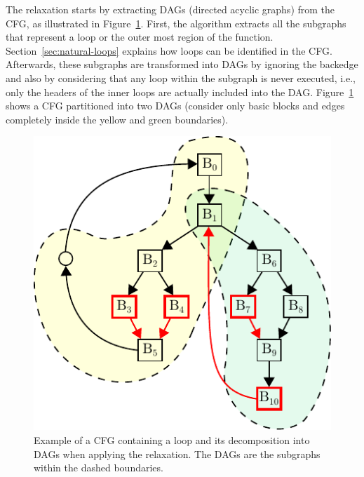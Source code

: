 \documentclass[sigplan,10pt]{acmart}
\theoremstyle{definition}
\begin{document}
The relaxation starts by extracting DAGs (directed acyclic graphs) from the CFG, as illustrated in Figure~\ref{fig:cfg-relax-example}.
First, the algorithm extracts all the subgraphs that represent a loop or the outer most region of the function.
Section~\ref{sec:natural-loops} explains how loops can be identified in the CFG.
Afterwards, these subgraphs are transformed into DAGs by ignoring the backedge and also by considering that any loop within the subgraph is never executed, i.e., only the headers of the inner loops are actually included into the DAG.
Figure~\ref{fig:cfg-relax-example} shows a CFG partitioned into two DAGs (consider only basic blocks and edges completely inside the yellow and green boundaries).

\begin{figure}[h]
  \centering
  \includegraphics[scale=0.85]{figs/cfg-relax-example.pdf}
  \caption{Example of a CFG containing a loop and its decomposition into DAGs when applying the relaxation.
           The DAGs are the subgraphs within the dashed boundaries.}
  \label{fig:cfg-relax-example}
\end{figure}

\end{document}
